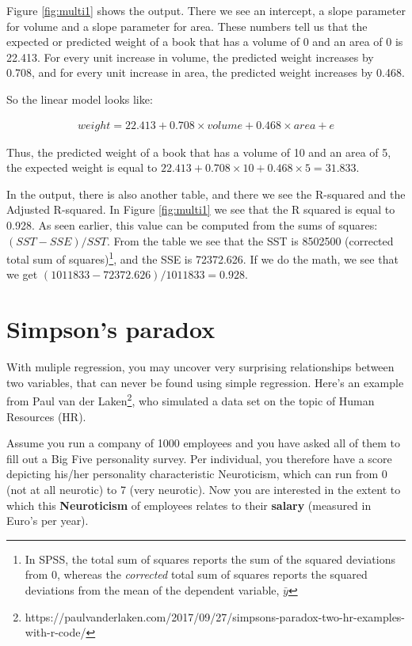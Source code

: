 \documentclass[]{book}\usepackage[]{graphicx}\usepackage[]{color}
\begin{document}
Figure \ref{fig:multi1} shows the output. There we see an intercept, a slope parameter for volume and a slope parameter for area. These numbers tell us that the expected or predicted weight of a book that has a volume of 0 and an area of 0 is 22.413. For every unit increase in volume, the predicted weight increases by 0.708, and for every unit increase in area, the predicted weight increases by 0.468.

So the linear model looks like:


\begin{eqnarray}
weight =  22.413 + 0.708 \times volume + 0.468 \times area + e
\end{eqnarray}

Thus, the predicted weight of a book that has a volume of 10 and an area of 5, the expected weight is equal to $22.413 + 0.708 \times 10 + 0.468 \times 5 = 31.833$.

In the output, there is also another table, and there we see the R-squared and the Adjusted R-squared. In Figure \ref{fig:multi1} we see that the R squared is equal to 0.928. As seen earlier, this value can be computed from the sums of squares: $(SST-SSE)/SST$. From the table we see that the SST is 8502500 (corrected total sum of squares)\footnote{In SPSS, the total sum of squares reports the sum of the squared deviations from 0, whereas the \textit{corrected} total sum of squares reports the squared deviations from the mean of the dependent variable, $\bar{y}$}, and the SSE is 72372.626. If we do the math, we see that we get $(1011833-72372.626)/1011833= 0.928$.



\section{Simpson's paradox}

With muliple regression, you may uncover very surprising relationships between two variables, that can never be found using simple regression. Here's an example from Paul van der Laken\footnote{https://paulvanderlaken.com/2017/09/27/simpsons-paradox-two-hr-examples-with-r-code/}, who simulated a data set on the topic of Human Resources (HR).

Assume you run a company of 1000 employees and you have asked all of them to fill out a Big Five personality survey. Per individual, you therefore have a score depicting his/her personality characteristic Neuroticism, which can run from 0 (not at all neurotic) to 7 (very neurotic). Now you are interested in the extent to which this \textbf{Neuroticism} of employees relates to their \textbf{salary} (measured in Euro’s per year).
\end{document}
